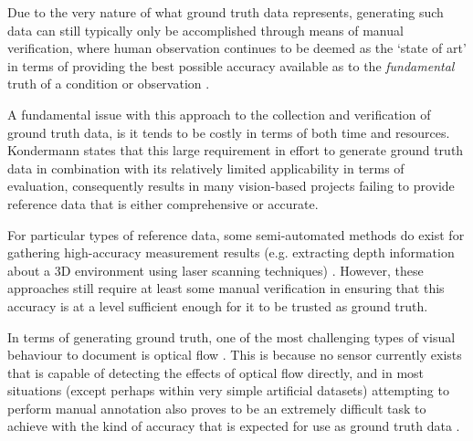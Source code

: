 Due to the very nature of what ground truth data represents, generating such data can still typically only be accomplished through means of manual verification, where human observation continues to be deemed as the `state of art' in terms of providing the best possible accuracy available as to the \textit{fundamental} truth of a condition or observation \cite{kondermann}. 

A fundamental issue with this approach to the collection and verification of ground truth data, is it tends to be costly in terms of both time and resources. Kondermann \cite{kondermann} states that this large requirement in effort to generate ground truth data in combination with its relatively limited applicability in terms of evaluation, consequently results in many vision-based projects failing to provide reference data that is either comprehensive or accurate.

For particular types of reference data, some semi-automated methods do exist for gathering high-accuracy measurement results (e.g. extracting depth information about a 3D environment using laser scanning techniques) \cite{haltakov}. However, these approaches still require at least some manual verification in ensuring that this accuracy is at a level sufficient enough for it to be trusted as ground truth.

In terms of generating ground truth, one of the most challenging types of visual behaviour to document is optical flow \cite{kondermann}. This is because no sensor currently exists that is capable of detecting the effects of optical flow directly, and in most situations (except perhaps within very simple artificial datasets) attempting to perform manual annotation also proves to be an extremely difficult task to achieve with the kind of accuracy that is expected for use as ground truth data \cite{haltakov}. 


